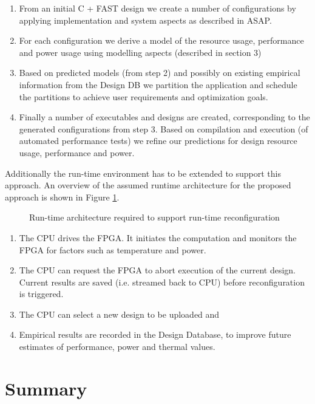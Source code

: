 \begin{enumerate}
\item From an initial C + FAST design we create a number of
  configurations by applying implementation and system aspects as
  described in ASAP.
\item For each configuration we derive a model of the resource usage,
  performance and power usage using modelling aspects (described in
  section 3)
\item Based on predicted models (from step 2) and possibly on existing
  empirical information from the Design DB we partition the
  application and schedule the partitions to achieve user requirements
  and optimization goals.
\item Finally a number of executables and designs are created,
  corresponding to the generated configurations from step 3. Based on
  compilation and execution (of automated performance tests) we refine
  our predictions for design resource usage, performance and power.
\end{enumerate}

Additionally the run-time environment has to be extended to support
this approach. An overview of the assumed runtime architecture for the
proposed approach is shown in Figure \ref{fig:reconfig-runtime}.

\begin{figure}[!ht]
  \centering
  \def\svgwidth{\textwidth}
  
  \caption{Run-time architecture required to support run-time reconfiguration}
  \label{fig:reconfig-runtime}
\end{figure}

\begin{enumerate}
\item The CPU drives the FPGA. It initiates the computation and
  monitors the FPGA for factors such as temperature and power.
\item The CPU can request the FPGA to abort execution of the current
  design. Current results are saved (i.e. streamed back to CPU)
  before reconfiguration is triggered.
\item The CPU can select a new design to be uploaded and
\item Empirical results are recorded in the Design Database, to
  improve future estimates of performance, power and thermal values.
\end{enumerate}

\section{Summary}
